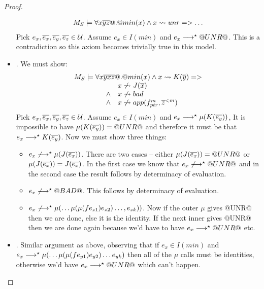 \documentclass[preprint]{sigplanconf}
\begin{document}
\begin{proof}
\begin{itemize}
        \[\begin{array}{l}
             M_S \models \forall x\overline{y}\overline{z} @.@ min(x) \land x \rightsquigarrow \mathop{unr} => \ldots 
        \end{array}\]
        Pick $e_x, \overline{e_x},\overline{e_y},\overline{e_z} \in {\cal U}$. Assume $e_x \in I(min)$ and $e_x \longrightarrow^{\star} @UNR@$. This
        is a contradiction so this axiom becomes trivially true in this model.
  \item {}. We must show:
        \[\begin{array}{l}
            M_S \models \forall x\overline{y}\overline{x}\overline{z} @.@ min(x) \land x \rightsquigarrow K(\overline{y}) => \\
            \qquad\qquad\begin{array}{ll}
                         & x \not\rightsquigarrow J(\overline{x}) \\ 
                   \land & x \not\rightsquigarrow \mathop{bad} \\
                   \land & x \not\rightsquigarrow app(f_{ptr}^m,\overline{z}^{< m})
                        \end{array}
        \end{array}\]
        Pick $e_x,\overline{e_x},\overline{e_y},\overline{e_z} \in {\cal U}$. Assume $e_x \in I(min)$ and $e_x \longrightarrow^{\star} \mu(K(\overline{e_y}))$,
        It is impossible to have $\mu(K(\overline{e_y})) = @UNR@$ and therefore it must be that 
        $e_x \longrightarrow^{\star} K(\overline{e_y})$. Now we must show three things:
        \begin{itemize}
          \item $e_x \not\longrightarrow^{\star} \mu(J(\overline{e_x}))$. There are two cases -- either 
                $\mu(J(\overline{e_x})) = @UNR@$ or $\mu(J(\overline{e_x})) = J(\overline{e_x})$. In the first case we know that
                $e_x \not\longrightarrow^{\star} @UNR@$ and in the second case the result follows by determinacy of evaluation.
          \item $e_x \not\longrightarrow^{\star} @BAD@$. This follows by determinacy of evaluation.
          \item $e_x \not\longrightarrow^{\star} \mu(\ldots\mu(\mu(f e_{z1}) e_{z2}) \ldots,e_{zk}))$. Now if the outer
                $\mu$ gives @UNR@ then we are done, else it is the identity. If the next inner gives @UNR@ 
                then we are done again because we'd have to have $e_x \longrightarrow^{\star} @UNR@$ etc.
        \end{itemize}
   \item {}. Similar argument as above, observing that if 
             $e_x \in I(min)$ and $e_x \longrightarrow^{\star} \mu(\ldots\mu(\mu(f e_{y1}) e_{y2}) \ldots e_{yk})$ then all
             of the $\mu$ calls must be identities, otherwise we'd have $e_x \longrightarrow^{\star} @UNR@$ which can't happen.

\end{itemize}
\end{proof}
\end{document}
